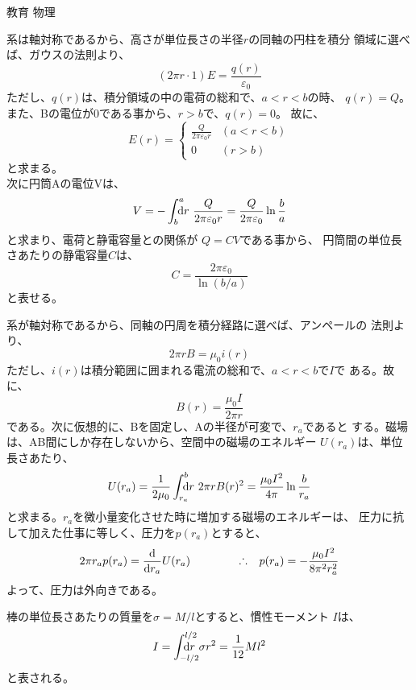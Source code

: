 \documentclass[fleqn]{jbook}
\begin{document}
\begin{answer}{教育 物理}{}




\begin{subanswers}
\SubAnswer

  \begin{subsubanswers}
  \SubSubAnswer
    系は軸対称であるから、高さが単位長さの半径$r$の同軸の円柱を積分
    領域に選べば、ガウスの法則より、
%
    \[ (2\pi r \cdot 1)E=\frac{q(r)}{\varepsilon_0} \]
%
    ただし、$q(r)$は、積分領域の中の電荷の総和で、$a<r<b$の時、
    $q(r)=Q$。また、Bの電位が$0$である事から、$r>b$で、$q(r)=0$。
    故に、
%
    \[ E(r) = \left\{\begin{array}{ll}%
                \frac{Q}{2\pi\varepsilon_0 r} & (a<r<b)\\
                0 & (r>b) \end{array}\right. \]
%
    と求まる。\\
%
    次に円筒Aの電位Vは、
%
    \[ V = -\Dint{b}{a}{\d{r}} \frac{Q}{2\pi\varepsilon_0 r}= \frac{Q}{2\pi\varepsilon_0}\ln\frac{b}{a} \]
%
    と求まり、電荷と静電容量との関係が $Q=CV$である事から、
    円筒間の単位長さあたりの静電容量$C$は、
%
    \[ C=\frac{2\pi\varepsilon_0}{\ln(b/a)} \]
%
    と表せる。


  \SubSubAnswer
    系が軸対称であるから、同軸の円周を積分経路に選べば、アンペールの
    法則より、
%
    \[ 2 \pi r B = \mu_0 i(r) \]
%
    ただし、$i(r)$は積分範囲に囲まれる電流の総和で、$a<r<b$で$I$で
    ある。故に、
%
    \[ B(r) = \frac{\mu_0 I}{2\pi r} \]
%
    である。次に仮想的に、Bを固定し、Aの半径が可変で、$r_a$であると
    する。磁場は、AB間にしか存在しないから、空間中の磁場のエネルギー
    $U(r_a)$は、単位長さあたり、
%
    \[ U(r_a) = \frac{1}{2\mu_0}\Dint{r_a}{b}{\d{r}} 2\pi r B(r)^2 %
              = \frac{\mu_0 I^2}{4\pi}\ln\frac{b}{r_a} \]
%
    と求まる。$r_a$を微小量変化させた時に増加する磁場のエネルギーは、
    圧力に抗して加えた仕事に等しく、圧力を$p(r_a)$とすると、
%
    \[ 2\pi r_a p(r_a) = \Deriver{}{r_a}U(r_a) \hspace{15mm} \Yueni p(r_a) = -\frac{\mu_0 I^2}{8\pi^2 r_a^2} \]
%
    よって、圧力は外向きである。

  \end{subsubanswers}



\SubAnswer

  \begin{subsubanswers}
  \SubSubAnswer
    棒の単位長さあたりの質量を$\sigma=M/l$とすると、慣性モーメント
    $I$は、
%
    \[ I = \Dint{-l/2}{l/2}{\d{r}} \sigma r^2 = \frac{1}{12}Ml^2 \]
%
    と表される。


\end{subsubanswers}
\end{subanswers}
\end{answer}
\end{document}
